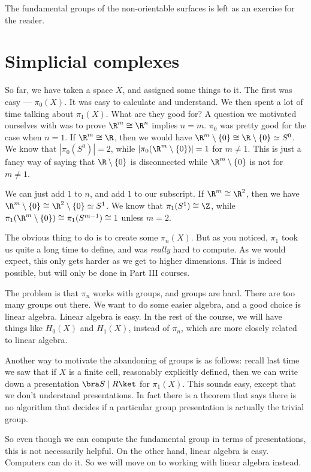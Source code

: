 \documentclass[a4paper]{article}
\begin{document}
The fundamental groups of the non-orientable surfaces is left as an exercise for the reader. %

\section{Simplicial complexes}
So far, we have taken a space $X$, and assigned some things to it. The first was easy --- $\pi_0(X)$. It was easy to calculate and understand. We then spent a lot of time talking about $\pi_1(X)$. What are they good for? A question we motivated ourselves with was to prove $\R^m \cong \R^n$ implies $n = m$. $\pi_0$ was pretty good for the case when $n = 1$. If $\R^m \cong \R$, then we would have $\R^m \setminus \{0\} \cong \R\setminus \{0\} \simeq S^0$. We know that $|\pi_0(S^0)| = 2$, while $|\pi_0(\R^m \setminus \{0\})| = 1$ for $m \not= 1$. This is just a fancy way of saying that $\R \setminus \{0\}$ is disconnected while $\R^m \setminus \{0\}$ is not for $m \not= 1$.

We can just add $1$ to $n$, and add $1$ to our subscript. If $\R^m \cong \R^2$, then we have $\R^m \setminus \{0\} \cong \R^2 \setminus \{0\} \simeq S^1$. We know that $\pi_1(S^1) \cong \Z$, while $\pi_1(\R^m \setminus \{0\}) \cong \pi_1(S^{m - 1}) \cong 1$ unless $m = 2$.

The obvious thing to do is to create some $\pi_n(X)$. But as you noticed, $\pi_1$ took us quite a long time to define, and was \emph{really} hard to compute. As we would expect, this only gets harder as we get to higher dimensions. This is indeed possible, but will only be done in Part III courses.

The problem is that $\pi_n$ works with groups, and groups are hard. There are too many groups out there. We want to do some easier algebra, and a good choice is linear algebra. Linear algebra is easy. In the rest of the course, we will have things like $H_0(X)$ and $H_1(X)$, instead of $\pi_n$, which are more closely related to linear algebra.

Another way to motivate the abandoning of groups is as follows: recall last time we saw that if $X$ is a finite cell, reasonably explicitly defined, then we can write down a presentation $\bra S \mid R\ket$ for $\pi_1 (X)$. This sounds easy, except that we don't understand presentations. In fact there is a theorem that says there is no algorithm that decides if a particular group presentation is actually the trivial group.

So even though we can compute the fundamental group in terms of presentations, this is not necessarily helpful. On the other hand, linear algebra is easy. Computers can do it. So we will move on to working with linear algebra instead.
\end{document}
